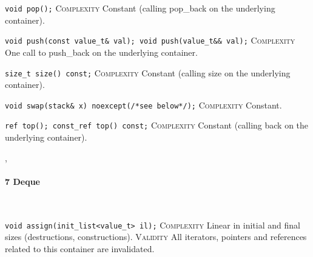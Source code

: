 \noindent{}\hspace*{0.25em}\lstinline[basicstyle=\ttfamily\color{cgreen}]{void pop();} \textsc{Complexity} Constant (calling pop\_back on the underlying container).\\\vspace{-0.6em}

\noindent{}\hspace*{0.25em}\lstinline{void push(const value_t& val); void push(value_t&& val);} \textsc{Complexity} One call to push\_back on the underlying container.\\\vspace{-0.6em}

\noindent{}\hspace*{0.25em}\lstinline[basicstyle=\ttfamily\color{cgreen}]{size_t size() const;} \textsc{Complexity} Constant (calling size on the underlying container).\\\vspace{-0.6em}

\noindent{}\hspace*{0.25em}\lstinline[basicstyle=\ttfamily\color{cgreen}]{void swap(stack& x) noexcept(/*see below*/);} \textsc{Complexity} Constant.\\\vspace{-0.6em}

\noindent{}\hspace*{0.25em}\lstinline[basicstyle=\ttfamily\color{cgreen}]{ref top(); const_ref top() const;} \textsc{Complexity} Constant (calling back on the underlying container).\\\vspace{-0.6em}


\sep
{}
\paragraph{7 Deque}\mbox{}\vspace{0.5em}\\
\noindent{}\hspace*{0.25em}\lstinline[basicstyle=\ttfamily\color{corange}]{void assign(init_list<value_t> il);} \textsc{Complexity} Linear in initial and final sizes (destructions, constructions). \textsc{Validity} All iterators, pointers and references related to this container are invalidated.\\\vspace{-0.6em}

